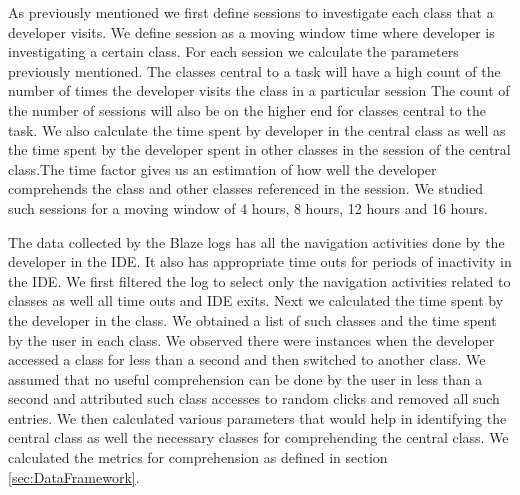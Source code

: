 As previously mentioned we first define sessions to investigate each class that a developer visits. We define session as a moving window time where developer is investigating a certain class. 
For each session we calculate the parameters previously mentioned. The classes central to a task will have a high count of the number of times the developer visits the class in a particular session 
The count of the number of sessions will also be on the higher end for classes central to the task.
We also calculate the time spent by developer in the central class as well as the time spent by the developer spent in other classes in the session of the central class.The time factor gives us an estimation of how well the developer comprehends the class and other classes referenced in the session. We studied such sessions for a moving window of 4 hours, 8 hours, 12 hours and 16 hours. 

The data collected by the Blaze logs has all the navigation activities done by the developer in the IDE. It also has appropriate time outs for periods of inactivity in the IDE. We first filtered the log to select only the navigation activities related to classes as well all time outs and IDE exits. Next we calculated the time spent by the developer in the class. We obtained a list of such classes and the time spent by the user in each class. We observed there were instances when the developer accessed a class for less than a second and then switched to another class. We assumed that no useful comprehension can be done by the user in less than a second and attributed such class accesses to random clicks and removed all such entries. We then calculated various parameters that would help in identifying the central class as well the necessary classes for comprehending the central class.   We calculated the metrics for comprehension as defined in section \ref{sec:DataFramework}.


